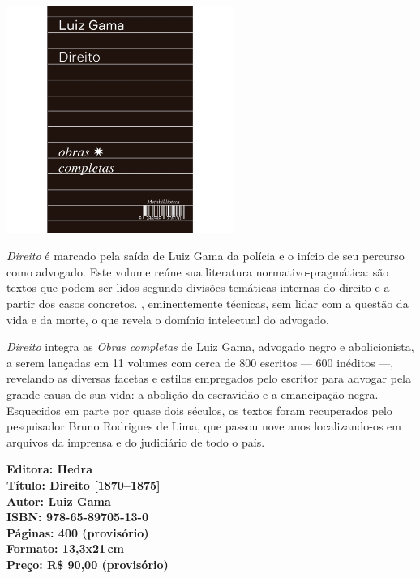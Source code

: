 \begin{center}
\hspace*{.5cm}\includegraphics[width=74mm]{./CAPAS/HEDRA_DIREITO.jpg}
\end{center}
\hspace*{-7cm}\hrulefill\hspace*{-7cm}
\medskip

\noindent{}\textit{Direito} é marcado pela saída de Luiz Gama da polícia e o início de seu percurso como advogado. Este volume reúne sua literatura normativo-pragmática: são textos que podem ser lidos segundo divisões temáticas internas do direito e a partir dos casos concretos. , eminentemente técnicas, sem lidar com a questão da vida e da morte, o que revela o domínio intelectual do advogado.

\textit{Direito} integra as \textit{Obras completas} de Luiz Gama, advogado negro e abolicionista, a serem lançadas em 11 volumes com cerca de 800 escritos --- 600 inéditos ---, revelando as diversas facetas e estilos empregados pelo escritor para advogar pela grande causa de sua vida: a abolição da escravidão e a emancipação negra. Esquecidos em parte por quase dois séculos, os textos foram recuperados pelo pesquisador Bruno Rodrigues de Lima, que passou nove anos localizando-os em arquivos da imprensa e do judiciário de todo o país.

\vfill
\noindent\begin{minipage}[c]{1\linewidth}
{\small\textbf{
\hspace*{-.1cm}Editora: Hedra\\
Título: Direito [1870--1875]\\
Autor: Luiz Gama\\ 
ISBN: 978-65-89705-13-0\\
Páginas: 400 (provisório)\\
Formato: 13,3x21\,cm\\
Preço: R\$ 90,00 (provisório)\\
}}
\end{minipage}
\pagebreak

